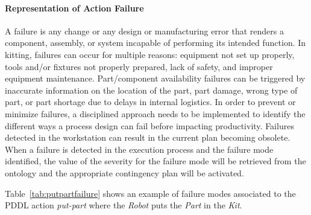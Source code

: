 \paragraph{Representation of Action Failure}\label{sss:failure}
 A failure is any change or any design or manufacturing error that renders a 
component, assembly, or system incapable of performing its intended function. 
In kitting, failures can occur for multiple reasons: equipment not set up properly, 
tools and/or fixtures not properly prepared, lack of safety, and improper equipment 
maintenance. Part/component availability failures can be triggered by inaccurate information 
on the location of the part, part damage, wrong type of part, or part shortage due to delays 
in internal logistics. In order to prevent or minimize failures, a disciplined approach 
needs to be implemented to identify the different ways a process design can fail before 
impacting productivity. Failures detected in the workstation can result in the current 
plan becoming obsolete. When a failure is detected in the execution process and the failure 
mode identified, the value of the severity for the failure mode will be retrieved from the 
ontology and the appropriate contingency plan will be activated.

 Table~\ref{tab:putpartfailure} shows an example of failure modes associated to the PDDL 
action \textsl{put-part} where the \textit{Robot} puts the \textit{Part} in the \textit{Kit}.


